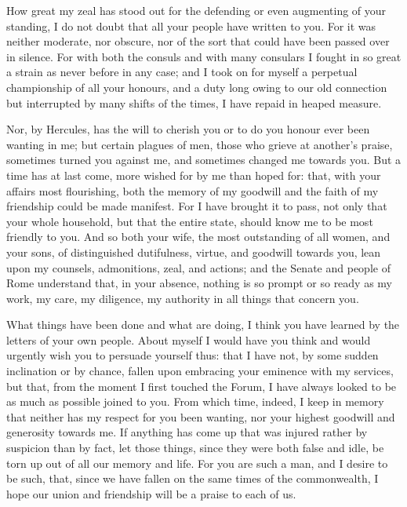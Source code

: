 

 How great my zeal has stood out for the defending or even augmenting of your standing, I do not doubt that all your people have written to you. For it was neither moderate, nor obscure, nor of the sort that could have been passed over in silence. For with both the consuls and with many consulars I fought in so great a strain as never before in any case; and I took on for myself a perpetual championship of all your honours, and a duty long owing to our old connection but interrupted by many shifts of the times, I have repaid in heaped measure.

 Nor, by Hercules, has the will to cherish you or to do you honour ever been wanting in me; but certain plagues of men, those who grieve at another's praise, sometimes turned you against me, and sometimes changed me towards you. But a time has at last come, more wished for by me than hoped for: that, with your affairs most flourishing, both the memory of my goodwill and the faith of my friendship could be made manifest. For I have brought it to pass, not only that your whole household, but that the entire state, should know me to be most friendly to you. And so both your wife, the most outstanding of all women, and your sons, of distinguished dutifulness, virtue, and goodwill towards you, lean upon my counsels, admonitions, zeal, and actions; and the Senate and people of Rome understand that, in your absence, nothing is so prompt or so ready as my work, my care, my diligence, my authority in all things that concern you.

 What things have been done and what are doing, I think you have learned by the letters of your own people. About myself I would have you think and would urgently wish you to persuade yourself thus: that I have not, by some sudden inclination or by chance, fallen upon embracing your eminence with my services, but that, from the moment I first touched the Forum, I have always looked to be as much as possible joined to you. From which time, indeed, I keep in memory that neither has my respect for you been wanting, nor your highest goodwill and generosity towards me. If anything has come up that was injured rather by suspicion than by fact, let those things, since they were both false and idle, be torn up out of all our memory and life. For you are such a man, and I desire to be such, that, since we have fallen on the same times of the commonwealth, I hope our union and friendship will be a praise to each of us.

